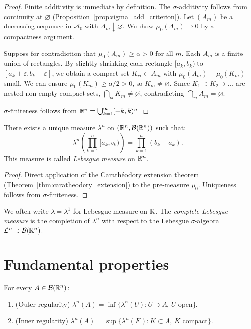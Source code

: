 \begin{proof}
Finite additivity is immediate by definition. The $\sigma$-additivity follows from
continuity at $\varnothing$ (Proposition~\ref{prop:sigma_add_criterion}). Let
$(A_m)$ be a decreasing sequence in $\mathcal{A}_0$ with $A_m \downarrow
\varnothing$. We show $\mu_0(A_m) \to 0$ by a compactness argument.

Suppose for contradiction that $\mu_0(A_m) \geq \alpha > 0$ for all $m$. Each
$A_m$ is a finite union of rectangles. By slightly shrinking each rectangle
$[a_k, b_k)$ to $[a_k + \varepsilon, b_k - \varepsilon]$, we obtain a compact set
$K_m \subset A_m$ with $\mu_0(A_m) - \mu_0(K_m)$ small. We can ensure
$\mu_0(K_m) \geq \alpha/2 > 0$, so $K_m \neq \varnothing$. Since
$K_1 \supset K_2 \supset \ldots$ are nested non-empty compact sets,
$\bigcap_m K_m \neq \varnothing$, contradicting $\bigcap_m A_m = \varnothing$.

$\sigma$-finiteness follows from $\mathbb{R}^n = \bigcup_{k=1}^{\infty} [-k, k)^n$.
\end{proof}

\begin{theorem}
\label{thm:lebesgue_measure}
There exists a unique measure $\lambda^n$ on $(\mathbb{R}^n, \mathcal{B}(\mathbb{R}^n))$ such that:
\[
\lambda^n\!\left(\prod_{k=1}^n [a_k, b_k)\right) = \prod_{k=1}^n (b_k - a_k).
\]
This measure is called \emph{Lebesgue measure} on $\mathbb{R}^n$.
\end{theorem}

\begin{proof}
Direct application of the Carath\'eodory extension theorem
(Theorem~\ref{thm:caratheodory_extension}) to the pre-measure $\mu_0$. Uniqueness
follows from $\sigma$-finiteness.
\end{proof}

\begin{remark}
We often write $\lambda = \lambda^1$ for Lebesgue measure on $\mathbb{R}$. The
\emph{complete Lebesgue measure} is the completion of $\lambda^n$ with respect to
the Lebesgue $\sigma$-algebra $\mathcal{L}^n \supset \mathcal{B}(\mathbb{R}^n)$.
\end{remark}

\section{Fundamental properties}

\begin{theorem}[Regularity]
\label{thm:lebesgue_regularity}
For every $A \in \mathcal{B}(\mathbb{R}^n)$:
\begin{enumerate}
    \item (Outer regularity) $\lambda^n(A) = \inf\{\lambda^n(U) :
    U \supset A,\, U \text{ open}\}$.
    \item (Inner regularity) $\lambda^n(A) = \sup\{\lambda^n(K) :
    K \subset A,\, K \text{ compact}\}$.
\end{enumerate}
\end{theorem}

